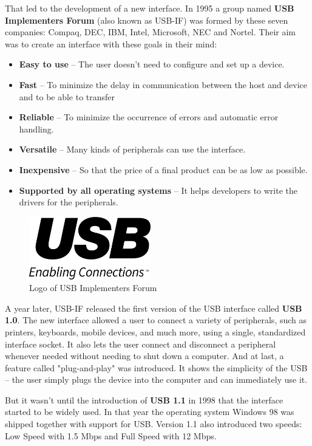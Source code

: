 That led to the development of a new interface. In 1995 a group named \textbf{USB Implementers Forum} (also known as USB-IF) was formed by these seven companies: Compaq, DEC, IBM, Intel, Microsoft, NEC and Nortel. Their aim was to create an interface with these goals in their mind:
\begin{itemize}
    \item \textbf{Easy to use} \--- The user doesn't need to configure and set up a device. 
    \item \textbf{Fast} \--- To minimize the delay in communication between the host and device and to be able to transfer 
    \item \textbf{Reliable} \--- To minimize the occurrence of errors and automatic error handling.
    \item \textbf{Versatile} \--- Many kinds of peripherals can use the interface.
    \item \textbf{Inexpensive} \--- So that the price of a final product can be as low as possible. 
    \item \textbf{Supported by all operating systems} \--- It helps developers to write the drivers for the peripherals.
\end{itemize}

\begin{figure}[ht]
    \centering
    \includegraphics[width=200px]{obrazky-figures/USB_Implementers_Forum_logo.png}
    \caption{Logo of USB Implementers Forum}
    \label{fig:usbif_logo}
\end{figure}

A year later, USB-IF released the first version of the USB interface called \textbf{USB 1.0}. The new interface allowed a user to connect a variety of peripherals, such as printers, keyboards, mobile devices, and much more, using a single, standardized interface socket. It also lets the user connect and disconnect a peripheral whenever needed without needing to shut down a computer. And at last, a feature called "plug-and-play" was introduced. It shows the simplicity of the USB \--- the user simply plugs the device into the computer and can immediately use it. 

But it wasn't until the introduction of \textbf{USB 1.1} in 1998 that the interface started to be widely used. In that year the operating system Windows 98 was shipped together with support for USB. Version 1.1 also introduced two speeds: Low Speed with 1.5 Mbps and Full Speed with 12 Mbps.

